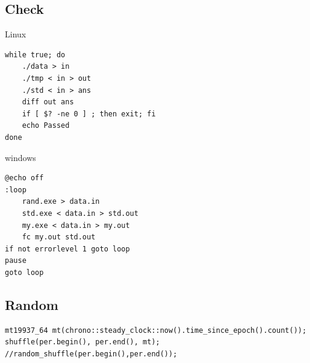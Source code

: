 \documentclass[10pt]{ctexart}
\begin{document}
{{\subsection{Check}
Linux
\begin{lstlisting}
while true; do
    ./data > in
    ./tmp < in > out
    ./std < in > ans
    diff out ans
    if [ $? -ne 0 ] ; then exit; fi
    echo Passed
done
\end{lstlisting}
windows
\begin{lstlisting}
@echo off  
:loop  
    rand.exe > data.in
    std.exe < data.in > std.out
    my.exe < data.in > my.out
    fc my.out std.out 
if not errorlevel 1 goto loop  
pause
goto loop
\end{lstlisting}
\subsection{Random}
\begin{lstlisting}
mt19937_64 mt(chrono::steady_clock::now().time_since_epoch().count());
shuffle(per.begin(), per.end(), mt);
//random_shuffle(per.begin(),per.end());
\end{lstlisting}
}}
\end{document}
